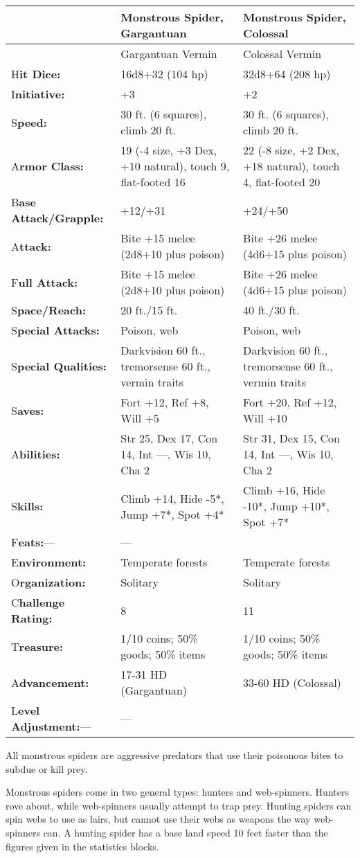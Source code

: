 \documentclass{article}
\begin{document}
\vspace{12pt}
\begin{tabular}{|>{\raggedright}p{59pt}|>{\raggedright}p{127pt}|>{\raggedright}p{127pt}|}
\hline
  & M\textbf{onstrous Spider, Gargantuan} & M\textbf{onstrous Spider, Colossal}\tabularnewline
\hline
  & Gargantuan Vermin & Colossal Vermin\tabularnewline
\hline
H\textbf{it Dice:} & 16d8+32 (104 hp) & 32d8+64 (208 hp)\tabularnewline
\hline
I\textbf{nitiative:} & +3 & +2\tabularnewline
\hline
S\textbf{peed:} & 30 ft. (6 squares), climb 20 ft. & 30 ft. (6 squares), climb 
20 ft.\tabularnewline
\hline
A\textbf{rmor Class:} & 19 (-4 size, +3 Dex, +10 natural), touch 9, flat-footed 
16 & 22 (-8 size, +2 Dex, +18 natural), touch 4, flat-footed 20\tabularnewline
\hline
B\textbf{ase Attack/Grapple:} & +12/+31 & +24/+50\tabularnewline
\hline
A\textbf{ttack:} & Bite +15 melee (2d8+10 plus poison) & Bite +26 melee (4d6+15 
plus poison)\tabularnewline
\hline
F\textbf{ull Attack:} & Bite +15 melee (2d8+10 plus poison) & Bite +26 melee (4d6+15 
plus poison)\tabularnewline
\hline
S\textbf{pace/Reach:} & 20 ft./15 ft. & 40 ft./30 ft.\tabularnewline
\hline
S\textbf{pecial Attacks:} & Poison, web & Poison, web\tabularnewline
\hline
S\textbf{pecial Qualities:} & Darkvision 60 ft., tremorsense 60 ft., vermin traits & Darkvision 
60 ft., tremorsense 60 ft., vermin traits\tabularnewline
\hline
S\textbf{aves:} & Fort +12, Ref +8, Will +5 & Fort +20, Ref +12, Will +10\tabularnewline
\hline
A\textbf{bilities:} & Str 25, Dex 17, Con 14, Int ---, Wis 10, Cha 2 & Str 31, 
Dex 15, Con 14, Int ---, Wis 10, Cha 2\tabularnewline
\hline
S\textbf{kills:} & Climb +14, Hide -5*, Jump +7*, Spot +4* & Climb +16, Hide -10*, 
Jump +10*, Spot +7*\tabularnewline
\hline
F\textbf{eats:}--- & --- & \tabularnewline
\hline
E\textbf{nvironment:} & Temperate forests & Temperate forests\tabularnewline
\hline
O\textbf{rganization:} & Solitary & Solitary\tabularnewline
\hline
C\textbf{hallenge Rating:} & 8 & 11\tabularnewline
\hline
T\textbf{reasure:} & 1/10 coins; 50\% goods; 50\% items & 1/10 coins; 50\% goods; 
50\% items\tabularnewline
\hline
A\textbf{dvancement:} & 17-31 HD (Gargantuan) & 33-60 HD (Colossal)\tabularnewline
\hline
L\textbf{evel Adjustment:}--- & --- & \tabularnewline
\hline
\end{tabular}

\vspace{12pt}
All monstrous spiders are aggressive predators that use their poisonous bites to 
subdue or kill prey.

Monstrous spiders come in two general types: hunters and web-spinners. Hunters 
rove about, while web-spinners usually attempt to trap prey. Hunting spiders can 
spin webs to use as lairs, but cannot use their webs as weapons the way web-spinners 
can. A hunting spider has a base land speed 10 feet faster than the figures given 
in the statistics blocks.
\end{document}
